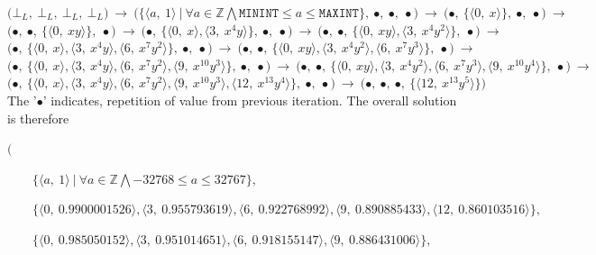 \documentclass[final,3p, review, times]{util/elsarticle}
\begin{document}
\noindent
$
\bigg(\bot_L,\ \bot_L,\ \bot_L,\ \bot_L\bigg)\ \to\ 
\bigg(\Big\{\big\langle a,\ 1\big\rangle\ \big|\ \forall a\in\mathbb{Z}\bigwedge\mathtt{MININT}\leq a\leq\mathtt{MAXINT}\Big\},\ \bullet,\ \bullet,\ \bullet\bigg)\ \to\ 
\bigg(\bullet,\ \Big\{\big\langle 0,\ x\big\rangle\Big\},\ \bullet,\ \bullet\bigg)\ \to
$\\
$
\bigg(\bullet,\ \bullet,\ \Big\{\big\langle 0,\ xy\big\rangle\Big\},\ \bullet\bigg)\ \to\ 
\bigg(\bullet,\ \Big\{\big\langle 0,\ x\big\rangle,\big\langle 3,\ x^4y\big\rangle\Big\},\ \bullet,\ \bullet\bigg)\ \to\ 
\bigg(\bullet,\ \bullet,\ \Big\{\big\langle 0,\ xy\big\rangle,\big\langle 3,\ x^4y^2\big\rangle\Big\},\ \bullet\bigg)\ \to\ 
$\\
$
\bigg(\bullet,\ \Big\{\big\langle 0,\ x\big\rangle,\big\langle 3,\ x^4y\big\rangle,\big\langle 6,\ x^7y^2\big\rangle\Big\},\ \bullet,\ \bullet\bigg)\ \to\ 
\bigg(\bullet,\ \bullet,\ \Big\{\big\langle 0,\ xy\big\rangle,\big\langle 3,\ x^4y^2\big\rangle,\big\langle 6,\ x^7y^3\big\rangle\Big\},\ \bullet\bigg)\ \to\ 
$\\
$
\bigg(\bullet,\ \Big\{\big\langle 0,\ x\big\rangle,\big\langle 3,\ x^4y\big\rangle,\big\langle 6,\ x^7y^2\big\rangle,\big\langle 9,\ x^{10}y^3\big\rangle\Big\},\ \bullet,\ \bullet\bigg)\ \to\ 
\bigg(\bullet,\ \bullet,\ \Big\{\big\langle 0,\ xy\big\rangle,\big\langle 3,\ x^4y^2\big\rangle,\big\langle 6,\ x^7y^3\big\rangle,\big\langle 9,\ x^{10}y^4\big\rangle\Big\},\ \bullet\bigg)\ \to\ 
$\\
$
\bigg(\bullet,\ \Big\{\big\langle 0,\ x\big\rangle,\big\langle 3,\ x^4y\big\rangle,\big\langle 6,\ x^7y^2\big\rangle,\big\langle 9,\ x^{10}y^3\big\rangle,\big\langle 12,\ x^{13}y^4\big\rangle\Big\},\ \bullet,\ \bullet\bigg)\ \to\ 
\bigg(\bullet,\ \bullet,\ \bullet,\ \Big\{\big\langle 12,\ x^{13}y^5\big\rangle\Big\}\bigg)
$\\
       
The '$\bullet$' indicates, repetition of value from previous iteration. The overall solution is therefore

$\bigg($

$\qquad\Big\{\big\langle a,\ 1\big\rangle\ \big|\ \forall a\in\mathbb{Z}\bigwedge-32768\leq a\leq32767\Big\},
$

$\qquad\Big\{\big\langle 0,\ 0.9900001526\big\rangle,\big\langle 3,\ 0.955793619\big\rangle,\big\langle 6,\ 0.922768992\big\rangle,\big\langle 9,\ 0.890885433\big\rangle,\big\langle 12,\ 0.860103516\big\rangle\Big\},
$

$\qquad\Big\{\big\langle 0,\ 0.985050152\big\rangle,\big\langle 3,\ 0.951014651\big\rangle,\big\langle 6,\ 0.918155147\big\rangle,\big\langle 9,\ 0.886431006\big\rangle\Big\},
$
\end{document}
